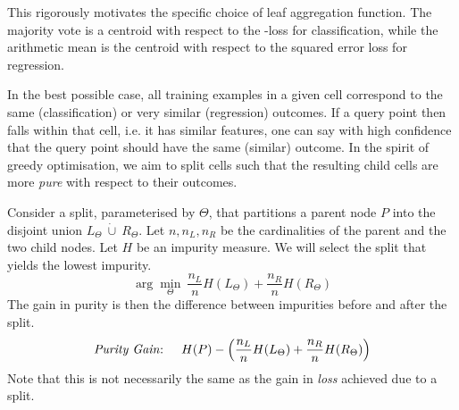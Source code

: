 \documentclass[
	twoside=false, %
]{kaobook}
\begin{document}
This rigorously motivates the specific choice of leaf aggregation function. The majority vote is a centroid with respect to the \zeroone-loss for classification, while the arithmetic mean is the centroid with respect to the squared error loss for regression.




In the best possible case, all training examples in a given cell correspond to the same (classification) or very similar (regression) outcomes. If a query point then falls within that cell, i.e. it has similar features, one can say with high confidence that the query point should have the same (similar) outcome. In the spirit of greedy optimisation, we aim to split cells such that the resulting child cells are more \textit{pure} with respect to their outcomes. 




Consider a split, parameterised by $\Theta$, that partitions a parent node $P$ into the disjoint union $L_{\Theta} ~\dot{\cup}~R_{\Theta}$. Let $n, n_{L}, n_{R}$ be the cardinalities of the parent and the two child nodes. Let $H$ be an impurity measure. We will select the split that yields the lowest impurity.
$$
\arg \min_{\Theta} ~ \frac{n_{L}}{n} H(L_{\Theta}) + \frac{n_{R}}{n} H(R_{\Theta})
$$
The gain in purity is then the difference between impurities before and after the split.
\begin{align}
\text{\textit{Purity Gain}: } \hspace{1em}
H(P) - \left(  \frac{n_{L}}{n} H(L_{\Theta}) + \frac{n_{R}}{n}H(R_{\Theta}) \right)
\label{eq:purity-gain}
\end{align}
Note that this is not necessarily the same as the gain in \textit{loss} achieved due to a split. 

\end{document}
